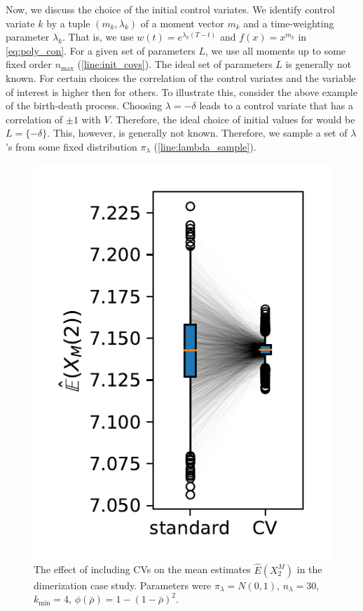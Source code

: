 Now, we discuss  the choice of the initial control  variates. We identify control  variate $k$ by
a tuple $({m}_k, \lambda_k)$ of a moment vector ${m}_k$
and a time-weighting
parameter $\lambda_k$.
That is, we use $w(t)=e^{\lambda_k(T-t)}$ and $f(x)=x^{m_k}$ in \eqref{eq:poly_con}.
For a given set of parameters $L$, we use all moments up to some fixed order $n_{\max}$ (\autoref{line:init_covs}).
The ideal set of parameters $L$ is generally not known. 
For certain choices the correlation of the control  variates and the variable of interest is
higher then for others.
To illustrate this, consider the above example of the birth-death process.
Choosing $\lambda=-\delta$ leads to a control variate that has a correlation of $\pm 1$ with
$V$. Therefore, the ideal
choice of initial values for would be $L=\{-\delta\}$.
This, however, is generally not known.
Therefore, we sample a set of $\lambda$'s
from some fixed distribution $\pi_{\lambda}$ (\autoref{line:lambda_sample}).
\begin{figure}[htb]
    \centering
    \includegraphics[scale=.6]{gfx/reduction.pdf}
    \caption[\ac{CV} mean estimates v.\ std.\ mean estimates]{The effect of including \acp{CV} on the mean estimates $\hat{E}(X^M_2)$ in the dimerization case study. Parameters were ${\pi}_{\lambda}=N(0,1)$, ${n}_{\lambda}=30$, ${k}_{\min}=4$, $\phi(\bar\rho)=1-{(1 - \bar\rho)}^2$.}
\end{figure}



